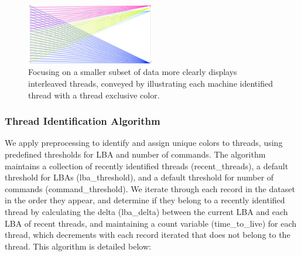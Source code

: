 \documentclass[journal]{vgtc}                %
\begin{document}
\begin{figure}[h!]
 \centering
 \includegraphics[width=0.5\textwidth]{images/interleaved_color4.eps}
 \caption[A subset of data rendered with a thread exclusive colors.]{Focusing on a smaller subset of data more clearly displays interleaved threads, conveyed by illustrating each machine identified thread with a thread exclusive color.}
 \label{fig:color_focus2}
\end{figure}

\subsubsection{Thread Identification Algorithm}
We apply preprocessing to identify and assign unique colors to threads, using predefined thresholds for LBA and number of commands. The algorithm maintains a collection of recently identified threads (recent\_threads), a default threshold for LBAs (lba\_threshold), and a default threshold for number of commands (command\_threshold). We iterate through each record in the dataset in the order they appear, and determine if they belong to a recently identified thread by calculating the delta (lba\_delta) between the current LBA and each LBA of recent threads, and maintaining a count variable (time\_to\_live) for each thread, which decrements with each record iterated that does not belong to the thread. This algorithm is detailed below:
\end{document}
